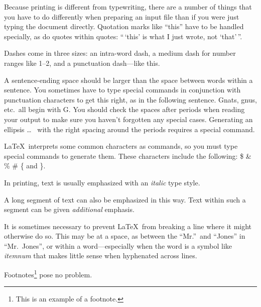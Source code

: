 \documentclass{UniVieCS_PhD}
\begin{document}
	Because printing is different from typewriting,
	there are a number of things that you have to do
	differently when preparing an input file than if
	you were just typing the document directly.
	Quotation marks like
	``this'' 
	have to be handled specially, as do quotes within
	quotes:
	``\,`this'            %
	is what I just 
	wrote, not  `that'\,''.  
	
	Dashes come in three sizes: an 
	intra-word 
	dash, a medium dash for number ranges like 
	1--2, 
	and a punctuation 
	dash---like 
	this.
	
	A sentence-ending space should be larger than the
	space between words within a sentence.  You
	sometimes have to type special commands in
	conjunction with punctuation characters to get
	this right, as in the following sentence.
	Gnats, gnus, etc.\ all  %
	begin with G\@.         %
	You should check the spaces after periods when
	reading your output to make sure you haven't
	forgotten any special cases.  Generating an
	ellipsis
	\ldots\               %
	with the right spacing around the periods requires
	a special command.
	
	\LaTeX\ interprets some common characters as
	commands, so you must type special commands to
	generate them.  These characters include the
	following:
	\$ \& \% \# \{ and \}.
	
	In printing, text is usually emphasized with an
	\emph{italic}  
	type style.  
	
	\begin{em}
		A long segment of text can also be emphasized 
		in this way.  Text within such a segment can be 
		given \emph{additional} emphasis.
	\end{em}
	
	It is sometimes necessary to prevent \LaTeX\ from
	breaking a line where it might otherwise do so.
	This may be at a space, as between the ``Mr.''\ and
	``Jones'' in
	``Mr.~Jones'',        %
	or within a word---especially when the word is a
	symbol like
	\mbox{\emph{itemnum}} 
	that makes little sense when hyphenated across
	lines.
	
	Footnotes\footnote{This is an example of a footnote.}
	pose no problem.
	
\end{document}
